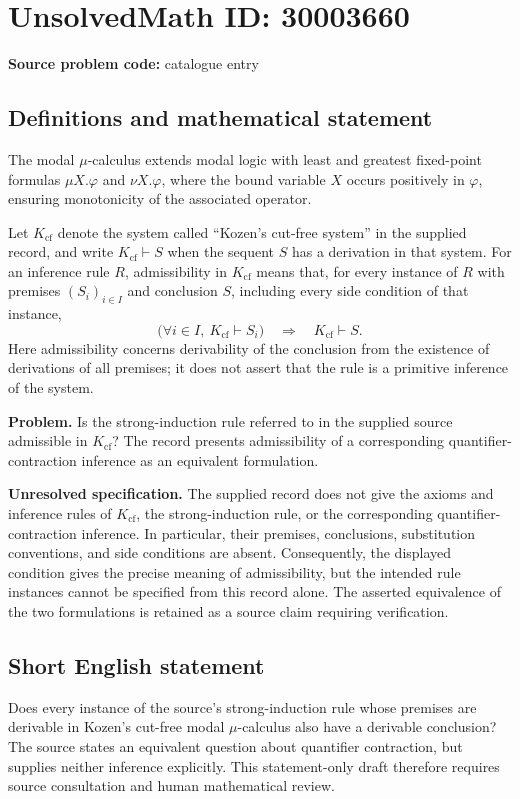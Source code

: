 \documentclass[11pt]{article}
\begin{document}
\section*{UnsolvedMath ID: 30003660}
\textbf{Source problem code:} catalogue entry
\subsection{Definitions and mathematical statement}
The modal $\mu$-calculus extends modal logic with least and greatest fixed-point formulas $\mu X.\varphi$ and $\nu X.\varphi$, where the bound variable $X$ occurs positively in $\varphi$, ensuring monotonicity of the associated operator.

Let $K_{\mathrm{cf}}$ denote the system called ``Kozen's cut-free system'' in the supplied record, and write $K_{\mathrm{cf}}\vdash S$ when the sequent $S$ has a derivation in that system. For an inference rule $R$, admissibility in $K_{\mathrm{cf}}$ means that, for every instance of $R$ with premises $(S_i)_{i\in I}$ and conclusion $S$, including every side condition of that instance,
\[
\bigl(\forall i\in I,\ K_{\mathrm{cf}}\vdash S_i\bigr)
\quad\Longrightarrow\quad
K_{\mathrm{cf}}\vdash S.
\]
Here admissibility concerns derivability of the conclusion from the existence of derivations of all premises; it does not assert that the rule is a primitive inference of the system.

\textbf{Problem.} Is the strong-induction rule referred to in the supplied source admissible in $K_{\mathrm{cf}}$? The record presents admissibility of a corresponding quantifier-contraction inference as an equivalent formulation.

\textbf{Unresolved specification.} The supplied record does not give the axioms and inference rules of $K_{\mathrm{cf}}$, the strong-induction rule, or the corresponding quantifier-contraction inference. In particular, their premises, conclusions, substitution conventions, and side conditions are absent. Consequently, the displayed condition gives the precise meaning of admissibility, but the intended rule instances cannot be specified from this record alone. The asserted equivalence of the two formulations is retained as a source claim requiring verification.
\subsection{Short English statement}
Does every instance of the source's strong-induction rule whose premises are derivable in Kozen's cut-free modal $\mu$-calculus also have a derivable conclusion? The source states an equivalent question about quantifier contraction, but supplies neither inference explicitly. This statement-only draft therefore requires source consultation and human mathematical review.
\end{document}
